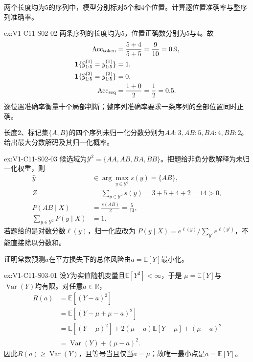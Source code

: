 \begin{SLChapterExercisePairSection}
\begin{exercise}\label{ex:V1-C11-S02-02}
两个长度均为5的序列中，模型分别标对5个和4个位置。计算逐位置准确率与整序列准确率。
\end{exercise}
\label{sol:V1-C11-S02-02}
\begin{chapterexercisesolution}{ex:V1-C11-S02-02}
两条序列的长度均为$5$，位置正确数分别为$5$与$4$。故
\[
\begin{aligned}
\mathrm{Acc}_{\rm token}
  &=\frac{5+4}{5+5}=\frac9{10}=0.9,\\
\mathbf1\{\widehat y^{(1)}_{1:5}=y^{(1)}_{1:5}\}&=1,\\
\mathbf1\{\widehat y^{(2)}_{1:5}=y^{(2)}_{1:5}\}&=0,\\
\mathrm{Acc}_{\rm seq}
  &=\frac{1+0}{2}=\frac12=0.5.
\end{aligned}
\]
逐位置准确率衡量十个局部判断；整序列准确率要求一条序列的全部位置同时正确。
\end{chapterexercisesolution}

\begin{exercise}\label{ex:V1-C11-S02-03}
长度2、标记集$\{A,B\}$的四个序列未归一化分数分别为$AA:3,AB:5,BA:4,BB:2$。给出最大分数解码及其归一化概率。
\end{exercise}
\label{sol:V1-C11-S02-03}
\begin{chapterexercisesolution}{ex:V1-C11-S02-03}
候选域为$\mathcal Y^2=\{AA,AB,BA,BB\}$。把题给非负分数解释为未归一化权重，则
\[
\begin{aligned}
\widehat y
  &\in\arg\max_{y\in\mathcal Y^2}s(y)=\{AB\},\\
Z&=\sum_{y\in\mathcal Y^2}s(y)=3+5+4+2=14>0,\\
P(AB\mid X)&=\frac{s(AB)}{Z}=\frac5{14},\\
\sum_{y\in\mathcal Y^2}P(y\mid X)&=1.
\end{aligned}
\]
若题给的是对数分数$\ell(y)$，归一化应改为
$P(y\mid X)=e^{\ell(y)}/\sum_{y'}e^{\ell(y')}$，不能直接除以分数和。
\end{chapterexercisesolution}

\begin{exercise}\label{ex:V1-C11-S03-01}
证明常数预测$a$在平方损失下的总体风险由$a=\mathbb E[Y]$最小化。
\end{exercise}
\label{sol:V1-C11-S03-01}
\begin{chapterexercisesolution}{ex:V1-C11-S03-01}
设$Y$为实值随机变量且$\mathbb E[Y^2]<\infty$，于是
$\mu=\mathbb E[Y]$与$\operatorname{Var}(Y)$均有限。对任意$a\in\mathbb R$，
\[
\begin{aligned}
R(a)
  &=\mathbb E[(Y-a)^2]\\
  &=\mathbb E[(Y-\mu+\mu-a)^2]\\
  &=\mathbb E[(Y-\mu)^2]
    +2(\mu-a)\mathbb E[Y-\mu]+(\mu-a)^2\\
  &=\operatorname{Var}(Y)+(\mu-a)^2.
\end{aligned}
\]
因此$R(a)\ge\operatorname{Var}(Y)$，且等号当且仅当$a=\mu$；故唯一最小点是$a=\mathbb E[Y]$。
\end{chapterexercisesolution}


\end{SLChapterExercisePairSection}
